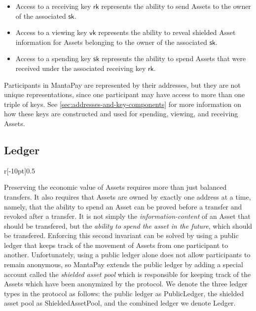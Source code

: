 \documentclass[a4paper]{article}
\theoremstyle{definition}
\newcommand{\Asset}{{\textsf{Asset}}}
\newcommand{\Ledger}{{\textsf{Ledger}}}
\newcommand{\MantaPay}{{\textsf{MantaPay}}}
\newcommand{\PublicLedger}{{\textsf{PublicLedger}}}
\newcommand{\ShieldedAssetPool}{{\textsf{ShieldedAssetPool}}}
\newcommand{\Transfer}{{\textsf{Transfer}}}
\newcommand{\UTXOSet}{{\textsf{UTXOSet}}}
\newcommand{\VoidNumberSet}{{\textsf{VoidNumberSet}}}
\newcommand{\allocate}{{\textsf{allocate}}}
\newcommand{\mint}{{\textsf{mint}}}
\newcommand{\reclaim}{{\textsf{reclaim}}}
\newcommand{\rk}{{\textsf{rk}}}
\newcommand{\sk}{{\textsf{sk}}}
\newcommand{\spend}{{\textsf{spend}}}
\newcommand{\vk}{{\textsf{vk}}}
\begin{document}
\begin{itemize}
    \item Access to a receiving key $\rk$ represents the ability to send \Asset{s} to the owner of the associated $\sk$.
    \item Access to a viewing key $\vk$ represents the ability to reveal shielded \Asset{} information for \Asset{s} belonging to the owner of the associated $\sk$.
    \item Access to a spending key $\sk$ represents the ability to spend \Asset{s} that were received under the associated receiving key $\rk$.
\end{itemize}

Participants in \MantaPay{} are represented by their addresses, but they are not unique representations, since one participant may have access to more than one triple of keys. See \autoref{sec:addresses-and-key-components} for more information on how these keys are constructed and used for spending, viewing, and receiving \Asset{s}.

\subsection{Ledger}

\begingroup
\setlength{\columnsep}{20pt}

\begin{wrapfigure}{r}[-10pt]{0.5\textwidth}
    \begin{center}
    \end{center}
    \caption{Lifecycle of an \Asset{}.}
\end{wrapfigure}

Preserving the economic value of \Asset{s} requires more than just balanced transfers. It also requires that \Asset{s} are owned by exactly one address at a time, namely, that the ability to spend an \Asset{} can be proved before a transfer and revoked after a transfer. It is not simply the \emph{information-content} of an \Asset{} that should be transfered, but the \emph{ability to spend the asset in the future}, which should be transfered. Enforcing this second invariant can be solved by using a public ledger\footnotemark{} that keeps track of the movement of \Asset{s} from one participant to another. Unfortunately, using a public ledger alone does not allow participants to remain anonymous, so \MantaPay{} extends the public ledger by adding a special account called the \emph{shielded asset pool} which is responsible for keeping track of the \Asset{s} which have been anonymized by the protocol. We denote the three ledger types in the protocol as follows: the public ledger as \PublicLedger{}, the shielded asset pool as \ShieldedAssetPool{}, and the combined ledger we denote \Ledger{}.
\end{document}
